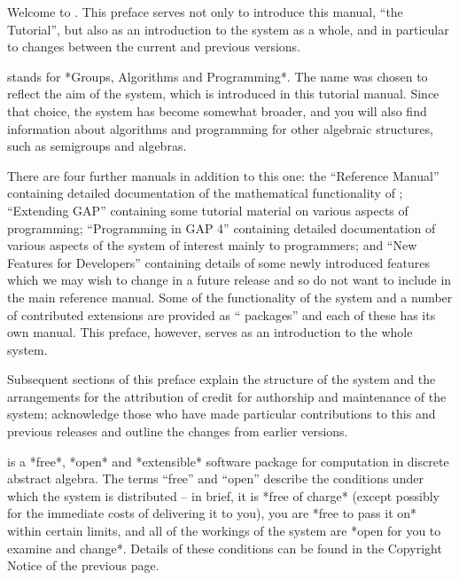 
Welcome to {\GAP}. This preface serves not only to introduce this
manual, ``the {\GAP} Tutorial'', but also as an introduction to the
system as a whole, and in particular to changes between the current and
previous versions.

{\GAP} stands  for  *Groups, Algorithms  and Programming*.  The  name was
chosen to reflect  the aim of  the  system, which  is introduced in  this
tutorial manual.  Since  that  choice,  the  system has become   somewhat
broader,    and  you will  also   find information   about algorithms and
programming  for other   algebraic structures,   such as semigroups   and
algebras.

There are four further manuals in addition to  this one: the ``Reference
Manual''    containing   detailed  documentation     of  the mathematical
functionality   of {\GAP}; ``Extending   GAP''  containing  some tutorial
material on various aspects  of {\GAP} programming;  ``Programming in
GAP 4'' containing detailed documentation   of various aspects   of the
system of interest mainly to programmers; and ``New Features for
Developers'' containing details of some newly introduced features
which we may wish to change in a future release and so do not want to
include in the main reference manual. Some of the functionality
of the system and a number of contributed extensions are provided as
``{\GAP} packages'' and each of these has its own manual. This
preface, however, serves as an introduction to the whole system.

Subsequent sections of this preface explain the structure of the
system and the arrangements for the attribution of credit for
authorship and maintenance of the system; acknowledge those who have
made particular contributions to this and previous releases and
outline the changes from earlier versions.





{\GAP}  is  a  *free*, *open*  and    *extensible*  software package  for
computation  in  discrete abstract  algebra.    The terms ``free''  and
``open'' describe the conditions under which the system is distributed --
in brief, it is *free of charge* (except possibly for the immediate costs
of delivering it to  you), you are *free  to pass  it on* within  certain
limits,  and all  of the  workings of  the  system are  *open  for you to
examine and   change*. Details of these conditions can be found
in the Copyright Notice of the previous page.

